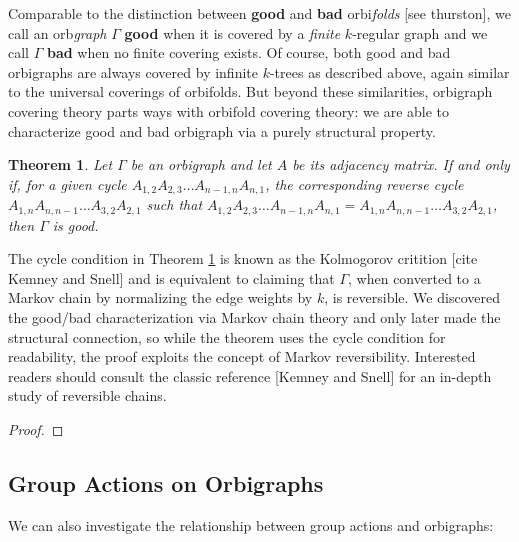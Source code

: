 \documentclass[12pt]{article}
\theoremstyle{plain}
\newtheorem{theorem}{Theorem}
\theoremstyle{definition}
\theoremstyle{remark}
\begin{document}
    Comparable to the distinction between \textbf{good} and \textbf{bad} orbi\textit{folds} [see thurston], we call an orb\textit{graph} $\Gamma$ \textbf{good} when it is covered by a \textit{finite} $k$-regular graph and we call $\Gamma$ \textbf{bad} when no finite covering exists. Of course, both good and bad orbigraphs are always covered by infinite $k$-trees as described above, again similar to the universal coverings of orbifolds. But beyond these similarities, orbigraph covering theory parts ways with orbifold covering theory: we are able to characterize good and bad orbigraph via a purely structural property.

    \begin{theorem}\label{thm:GoodBadCharacterization}
      Let $\Gamma$ be an orbigraph and let $A$ be its adjacency matrix. If and only if, for a given cycle $A_{1,2} A_{2,3} \ldots A_{n-1, n} A_{n, 1}$, the corresponding reverse cycle $A_{1, n} A_{n, n-1} \ldots A_{3,2} A_{2,1}$ such that $A_{1,2} A_{2,3} \ldots A_{n-1, n} A_{n, 1} = A_{1, n} A_{n, n-1} \ldots A_{3,2} A_{2,1}$, then $\Gamma$ is good.
    \end{theorem}

    The cycle condition in Theorem \ref{thm:GoodBadCharacterization} is known as the Kolmogorov critition [cite Kemney and Snell] and is equivalent to claiming that $\Gamma$, when converted to a Markov chain by normalizing the edge weights by $k$, is reversible. We discovered the good/bad characterization via Markov chain theory and only later made the structural connection, so while the theorem uses the cycle condition for readability, the proof exploits the concept of Markov reversibility. Interested readers should consult the classic reference [Kemney and Snell] for an in-depth study of reversible chains. %

    \begin{proof}
      
    \end{proof}


  \subsection{Group Actions on Orbigraphs}

    We can also investigate the relationship between group actions and orbigraphs:
\end{document}
